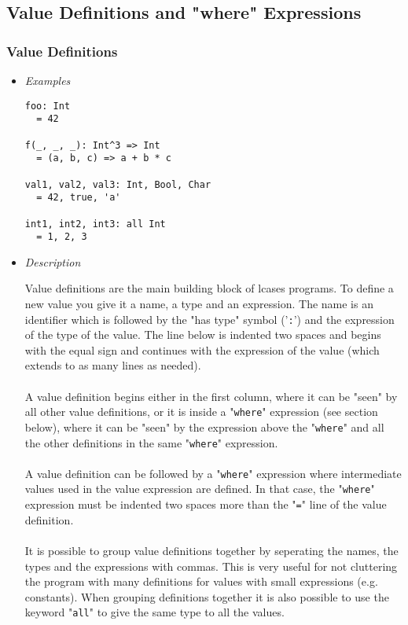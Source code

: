 \documentclass{article}
\begin{document}
\newpage

\subsection{Value Definitions and "where" Expressions}
\label{subsec:valdefswhere}

\subsubsection{Value Definitions}
\label{subsubsec:valdefs}

\begin{itemize}

\item \textit{Examples}

\begin{verbatim}
foo: Int
  = 42

f(_, _, _): Int^3 => Int
  = (a, b, c) => a + b * c

val1, val2, val3: Int, Bool, Char
  = 42, true, 'a'

int1, int2, int3: all Int
  = 1, 2, 3
\end{verbatim}

\item \textit{Description}

Value definitions are the main building block of lcases programs. To define a
new value you give it a name, a type and an expression. The name is an
identifier which is followed by the "has type" symbol ('\verb|:|') and the
expression of the type of the value. The line below is indented two spaces and
begins with the equal sign and continues with the expression of the value
(which extends to as many lines as needed).
\\\\
A value definition begins either in the first column, where it can be "seen" by
all other value definitions, or it is inside a "\verb|where|" expression (see
section below), where it can be "seen" by the expression above the
"\verb|where|" and all the other definitions in the same "\verb|where|"
expression.
\\\\
A value definition can be followed by a "\verb|where|" expression where
intermediate values used in the value expression are defined. In that case, the
"\verb|where|" expression must be indented two spaces more than the "\verb|=|"
line of the value definition.
\\\\
It is possible to group value definitions together by seperating the names, the
types and the expressions with commas. This is very useful for not cluttering
the program with many definitions for values with small expressions (e.g.
constants).  When grouping definitions together it is also possible to use the
keyword "\verb|all|" to give the same type to all the values.


\end{itemize}
\end{document}
